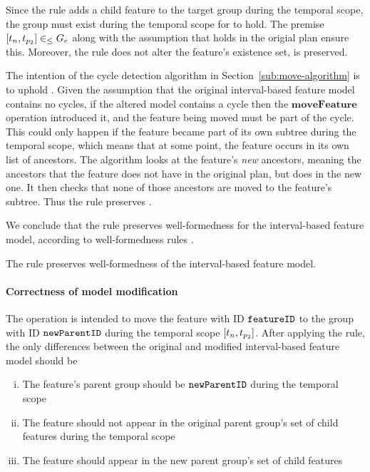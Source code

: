 Since the rule adds a child feature to the target group during the temporal scope, the group must exist during the temporal scope for  to hold. The premise $\interval{t_n}{t_{p_2}} \inn G_e$ along with the assumption that  holds in the origial plan ensure this. Moreover, the rule does not alter the feature's existence set,  is preserved. 

The intention of the cycle detection algorithm in Section~\vref{sub:move-algorithm} is to uphold . Given the assumption that the original interval-based feature model contains no cycles, if the altered model contains a cycle then the $\textbf{moveFeature}$ operation introduced it, and the feature being moved must be part of the cycle. This could only happen if the feature became part of its own subtree during the temporal scope, which means that at some point, the feature occurs in its own list of ancestors. The algorithm looks at the feature's \emph{new} ancestors, meaning the ancestors that the feature does not have in the original plan, but does in the new one. It then checks that none of those ancestors are moved to the feature's subtree. Thus the rule preserves .

We conclude that the  rule preserves well-formedness for the interval-based feature model, according to well-formedness rules . 
\\

\begin{lemma}
   The  rule preserves well-formedness of the interval-based feature model. 
   \label{lemma:move-feature-well-formed}
\end{lemma}

\paragraph{Correctness of model modification}
The operation is intended to move the feature with ID $\texttt{featureID}$ to the group with ID $\texttt{newParentID}$ during the temporal scope $\interval{t_n}{t_{p_2}}$. After applying the  rule, the only differences between the original and modified interval-based feature model should be
\begin{enumerate}[(i)]
   \item The feature's parent group should be $\texttt{newParentID}$ during the temporal scope \label{move-feature-parentgroup}
   \item The feature should not appear in the original parent group's set of child features during the temporal scope \label{move-feature-oldparent}
   \item The feature should appear in the new parent group's set of child features \label{move-feature-newparent}
\end{enumerate}


